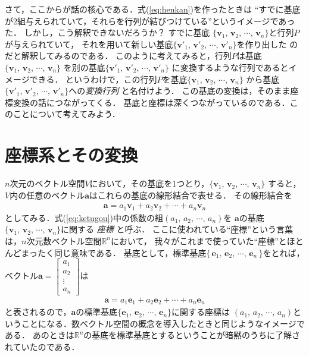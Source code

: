 さて，ここからが話の核心である．式(\ref{eq:henkan})を作ったときは
``すでに基底が2組与えられていて，それらを行列が結びつけている''というイメージであった．
しかし，こう解釈できないだろうか？ すでに基底
$ \{ \bm{v}_1, \, \bm{v}_2, \, \cdots, \, \bm{v}_n \} $と行列$P$が与えられていて，
それを用いて新しい基底$ \{ \bm{v}'_1, \, \bm{v}'_2, \, \cdots, \, \bm{v}'_n \} $を作り出した
のだと解釈してみるのである．
このように考えてみると，行列$P$は基底$ \{ \bm{v}_1, \, \bm{v}_2, \, \cdots, \, \bm{v}_n \} $
を別の基底$ \{ \bm{v}'_1, \, \bm{v}'_2, \, \cdots, \, \bm{v}'_n \} $
に変換するような行列であるとイメージできる．
というわけで，この行列$P$を基底$ \{ \bm{v}_1, \, \bm{v}_2, \, \cdots, \, \bm{v}_n \} $
から基底$ \{ \bm{v}'_1, \, \bm{v}'_2, \, \cdots, \, \bm{v}'_n \} $への\emph{変換行列}
と名付けよう．
この基底の変換は，そのまま座標変換の話につながってくる．
基底と座標は深くつながっているのである．このことについて考えてみよう．
\section{座標系とその変換}\label{zahyoukei}
\label{sec:zahyoukei}
$n$次元のベクトル空間$V$において，その基底を1つとり，$ \{ \bm{v}_1, \, \bm{v}_2, \, \cdots, \, \bm{v}_n \} $
すると，$V$内の任意のベクトル$\bm{a}$はこれらの基底の線形結合で表せる．
その線形結合を
\begin{align}
\bm{a} = a_1 \bm{v}_1 + a_2 \bm{v}_2 + \cdots + a_n \bm{v}_n 
\label{eq:ketugou}
\end{align}
としてみる．式(\ref{eq:ketugou})中の係数の組$(a_1, \, a_2, \, \cdots , \, a_n)$を
$\bm{a}$の基底$ \{ \bm{v}_1, \, \bm{v}_2, \, \cdots, \, \bm{v}_n \} $に関する
\emph{座標}
と呼ぶ．
ここに使われている``座標''という言葉は，$n$次元数ベクトル空間$\mathbb{R}^n$において，
我々がこれまで使っていた``座標''とほとんどまったく同じ意味である．
基底として，標準基底$ \{ \, \bm{e}_1, \, \bm{e}_2, \, \cdots , \, \bm{e}_n \, \} $をとれば，
ベクトル$\bm{a} = \left[
\begin{array}{c}
a_1 \\
a_2 \\
\vdots \\
a_n
\end{array}
\right]
$は
\begin{align*}
\bm{a} = a_1 \bm{e}_1 + a_2 \bm{e}_2 + \cdots + a_n \bm{e}_n
\end{align*}
と表されるので，$\bm{a}$の標準基底$ \{ \bm{e}_1, \, \bm{e}_2 , \, \cdots , \, \bm{e}_n \} $に関する座標は
$( a_1, \, a_2, \, \cdots , \, a_n)$ということになる．数ベクトル空間の概念を導入したときと同じようなイメージである．
あのときは$\mathbb{R}^n$の基底を標準基底とするということが暗黙のうちに了解されていたのである．


